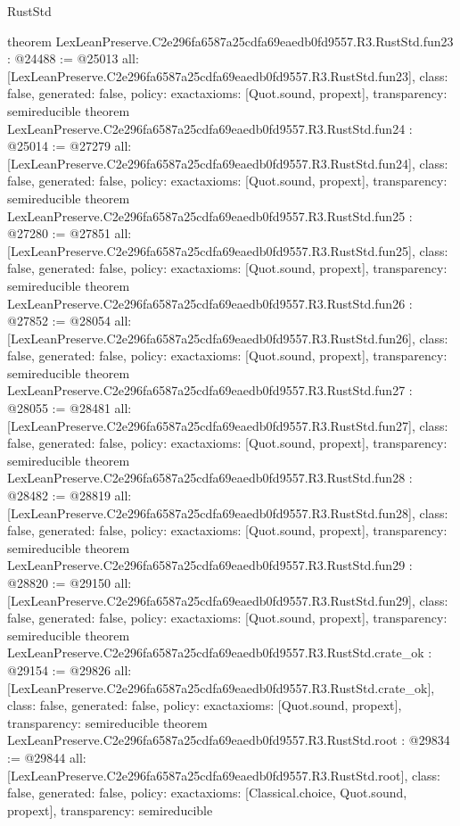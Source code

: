 \begin{lexlean}{RustStd}
\begin{coremodule}
{}
theorem LexLeanPreserve.C2e296fa6587a25cdfa69eaedb0fd9557.R3.RustStd.fun23 : @24488 := @25013 {
  all: [LexLeanPreserve.C2e296fa6587a25cdfa69eaedb0fd9557.R3.RustStd.fun23],
  class: false,
  generated: false,
  policy: exact{axioms: [Quot.sound, propext]},
  transparency: semireducible
}
theorem LexLeanPreserve.C2e296fa6587a25cdfa69eaedb0fd9557.R3.RustStd.fun24 : @25014 := @27279 {
  all: [LexLeanPreserve.C2e296fa6587a25cdfa69eaedb0fd9557.R3.RustStd.fun24],
  class: false,
  generated: false,
  policy: exact{axioms: [Quot.sound, propext]},
  transparency: semireducible
}
theorem LexLeanPreserve.C2e296fa6587a25cdfa69eaedb0fd9557.R3.RustStd.fun25 : @27280 := @27851 {
  all: [LexLeanPreserve.C2e296fa6587a25cdfa69eaedb0fd9557.R3.RustStd.fun25],
  class: false,
  generated: false,
  policy: exact{axioms: [Quot.sound, propext]},
  transparency: semireducible
}
theorem LexLeanPreserve.C2e296fa6587a25cdfa69eaedb0fd9557.R3.RustStd.fun26 : @27852 := @28054 {
  all: [LexLeanPreserve.C2e296fa6587a25cdfa69eaedb0fd9557.R3.RustStd.fun26],
  class: false,
  generated: false,
  policy: exact{axioms: [Quot.sound, propext]},
  transparency: semireducible
}
theorem LexLeanPreserve.C2e296fa6587a25cdfa69eaedb0fd9557.R3.RustStd.fun27 : @28055 := @28481 {
  all: [LexLeanPreserve.C2e296fa6587a25cdfa69eaedb0fd9557.R3.RustStd.fun27],
  class: false,
  generated: false,
  policy: exact{axioms: [Quot.sound, propext]},
  transparency: semireducible
}
theorem LexLeanPreserve.C2e296fa6587a25cdfa69eaedb0fd9557.R3.RustStd.fun28 : @28482 := @28819 {
  all: [LexLeanPreserve.C2e296fa6587a25cdfa69eaedb0fd9557.R3.RustStd.fun28],
  class: false,
  generated: false,
  policy: exact{axioms: [Quot.sound, propext]},
  transparency: semireducible
}
theorem LexLeanPreserve.C2e296fa6587a25cdfa69eaedb0fd9557.R3.RustStd.fun29 : @28820 := @29150 {
  all: [LexLeanPreserve.C2e296fa6587a25cdfa69eaedb0fd9557.R3.RustStd.fun29],
  class: false,
  generated: false,
  policy: exact{axioms: [Quot.sound, propext]},
  transparency: semireducible
}
theorem LexLeanPreserve.C2e296fa6587a25cdfa69eaedb0fd9557.R3.RustStd.crate_ok : @29154 := @29826 {
  all: [LexLeanPreserve.C2e296fa6587a25cdfa69eaedb0fd9557.R3.RustStd.crate_ok],
  class: false,
  generated: false,
  policy: exact{axioms: [Quot.sound, propext]},
  transparency: semireducible
}
theorem LexLeanPreserve.C2e296fa6587a25cdfa69eaedb0fd9557.R3.RustStd.root : @29834 := @29844 {
  all: [LexLeanPreserve.C2e296fa6587a25cdfa69eaedb0fd9557.R3.RustStd.root],
  class: false,
  generated: false,
  policy: exact{axioms: [Classical.choice, Quot.sound, propext]},
  transparency: semireducible
}


\end{coremodule}
\end{lexlean}
